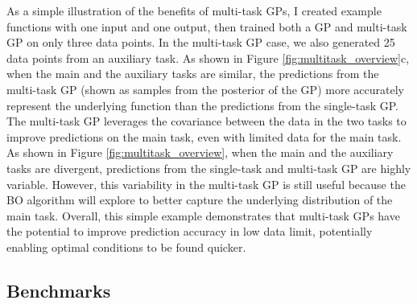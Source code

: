 As a simple illustration of the benefits of multi-task GPs, I created example functions with one input and one output, then trained both a GP and multi-task GP on only three data points. In the multi-task GP case, we also generated 25 data points from an auxiliary task. As shown in Figure \ref{fig:multitask_overview}c, when the main and the auxiliary tasks are similar, the predictions from the multi-task GP (shown as samples from the posterior of the GP) more accurately represent the underlying function than the predictions from the single-task GP. The multi-task GP leverages the covariance between the data in the two tasks to improve predictions on the main task, even with limited data for the main task. As shown in Figure \ref{fig:multitask_overview}, when the main and the auxiliary tasks are divergent, predictions from the single-task and multi-task GP are highly variable. However, this variability in the multi-task GP is still useful because the BO algorithm will explore to better capture the underlying distribution of the main task. Overall, this simple example demonstrates that multi-task GPs have the potential to improve prediction accuracy in low data limit, potentially enabling optimal conditions to be found quicker.

\subsection{Benchmarks}


